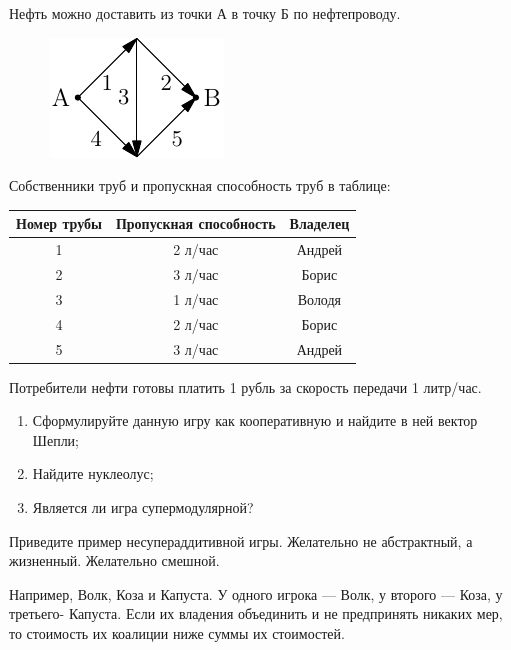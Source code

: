 \begin{problem}[Нефтепровод.]

Нефть можно доставить из точки А в точку Б по нефтепроводу.

\begin{figure}[!htbp]
	\includegraphics{coop_nefteprovod.pdf}
\end{figure}

Собственники труб и пропускная способность труб в таблице:

\begin{tabular}{|c|c|c|}

\hline
Номер трубы & Пропускная способность & Владелец \\
\hline
1 & 2 л/час & Андрей \\
2 & 3 л/час & Борис \\
3 & 1 л/час & Володя \\
4 & 2 л/час & Борис \\
5 & 3 л/час & Андрей \\
\hline
\end{tabular}

Потребители нефти готовы платить 1 рубль за скорость передачи 1 литр/час.
\begin{enumerate}
\item Сформулируйте данную игру как кооперативную и найдите в ней  вектор Шепли;
\item Найдите нуклеолус;
\item Является ли игра супермодулярной?
\end{enumerate}



\begin{sol}

\end{sol}
\end{problem}






\begin{problem}
Приведите пример несупераддитивной игры. Желательно не абстрактный, а жизненный. Желательно смешной.



\begin{sol}
Например, Волк, Коза и Капуста. У одного игрока — Волк, у второго — Коза, у третьего- Капуста. Если их владения объединить и не предпринять никаких мер, то стоимость их коалиции ниже суммы их стоимостей.
\end{sol}
\end{problem}





